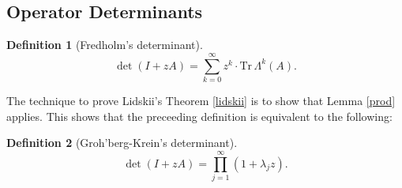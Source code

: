 \documentclass[a4paper]{article}
\newcommand{\Tr}{\textrm{Tr}\,}
\theoremstyle{definition}
\newtheorem{definition}{Definition}[section]
\theoremstyle{remark}
\theoremstyle{remark}
\begin{document}
\subsection{Operator Determinants}

\begin{definition}[Fredholm's determinant]
    \begin{equation}
        \det (I + z A) = \sum_{k=0}^{\infty} z^k \cdot \Tr \Lambda^k (A) . 
    \end{equation}
\end{definition}

The technique to prove Lidskii's Theorem \ref{lidskii} is to show that Lemma \ref{prod} applies. This shows that the preceeding definition is equivalent to the following: 

\begin{definition}[Groh'berg-Krein's determinant]
    \begin{equation}
        \det (I + z A) = \prod_{j=1}^{\infty} (1 + \lambda_j z) . 
    \end{equation}
\end{definition}


\end{document}
